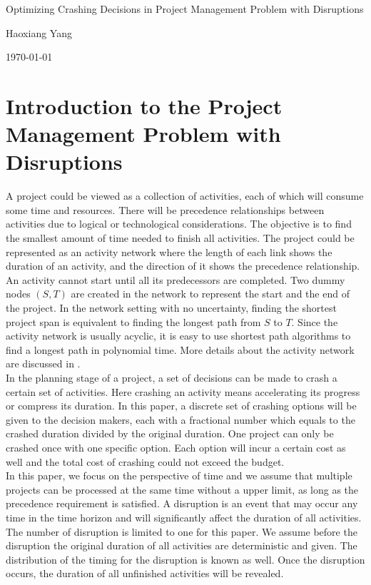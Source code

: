 \documentclass[11pt]{article}
\newcommand{\ms}{\medskip}
\begin{document}
\baselineskip0.25in

\begin{center}
\begin{large}
\begin{bf}

Optimizing Crashing Decisions in Project Management Problem with Disruptions \ms

Haoxiang Yang \ms

\today \ms
\end{bf}
\end{large}
\end{center}

\section{Introduction to the Project Management Problem with Disruptions}
	A project could be viewed as a collection of activities, each of which will consume some time and resources. There will be precedence relationships between activities due to logical or technological considerations. The objective is to find the smallest amount of time needed to finish all activities. The project could be represented as an activity network where the length of each link shows the duration of an activity, and the direction of it shows the precedence relationship. An activity cannot start until all its predecessors are completed. Two dummy nodes \((S,T)\) are created in the network to represent the start and the end of the project. In the network setting with no uncertainty, finding the shortest project span is equivalent to finding the longest path from \(S\) to \(T\). Since the activity network is usually acyclic, it is easy to use shortest path algorithms to find a longest path in polynomial time. More details about the activity network are discussed in \cite{Elmaghraby77}.\\
	\newline In the planning stage of a project, a set of decisions can be made to crash a certain set of activities. Here crashing an activity means accelerating its progress or compress its duration. In this paper, a discrete set of crashing options will be given to the decision makers, each with a fractional number which equals to the crashed duration divided by the original duration. One project can only be crashed once with one specific option. Each option will incur a certain cost as well and the total cost of crashing could not exceed the budget.\\
	\newline In this paper, we focus on the perspective of time and we assume that multiple projects can be processed at the same time without a upper limit, as long as the precedence requirement is satisfied. A disruption is an event that may occur any time in the time horizon and will significantly affect the duration of all activities. The number of disruption is limited to one for this paper. We assume before the disruption the original duration of all activities are deterministic and given. The distribution of the timing for the disruption is known as well. Once the disruption occurs, the duration of all unfinished activities will be revealed. \\
\end{document}

